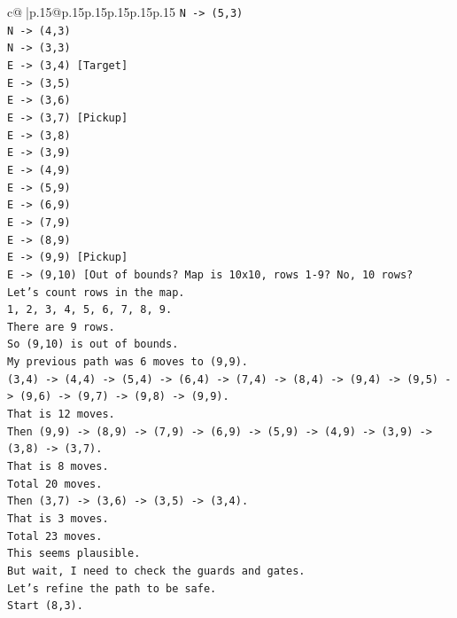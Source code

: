 \documentclass{article}
\begin{document}
{\begin{supertabular}{c@{$\;$}|p{.15\linewidth}@{}p{.15\linewidth}p{.15\linewidth}p{.15\linewidth}p{.15\linewidth}p{.15\linewidth}}
{{{\texttt{N {-}> (5,3)} \\
\texttt{N {-}> (4,3)} \\
\texttt{N {-}> (3,3)} \\
\texttt{E {-}> (3,4) {[}Target{]}} \\
\texttt{E {-}> (3,5)} \\
\texttt{E {-}> (3,6)} \\
\texttt{E {-}> (3,7) {[}Pickup{]}} \\
\texttt{E {-}> (3,8)} \\
\texttt{E {-}> (3,9)} \\
\texttt{E {-}> (4,9)} \\
\texttt{E {-}> (5,9)} \\
\texttt{E {-}> (6,9)} \\
\texttt{E {-}> (7,9)} \\
\texttt{E {-}> (8,9)} \\
\texttt{E {-}> (9,9) {[}Pickup{]}} \\
\texttt{E {-}> (9,10) {[}Out of bounds? Map is 10x10, rows 1{-}9? No, 10 rows?} \\
\texttt{Let's count rows in the map.} \\
\texttt{1, 2, 3, 4, 5, 6, 7, 8, 9.} \\
\texttt{There are 9 rows.} \\
\texttt{So (9,10) is out of bounds.} \\
\texttt{My previous path was 6 moves to (9,9).} \\
\texttt{(3,4) {-}> (4,4) {-}> (5,4) {-}> (6,4) {-}> (7,4) {-}> (8,4) {-}> (9,4) {-}> (9,5) {-}> (9,6) {-}> (9,7) {-}> (9,8) {-}> (9,9).} \\
\texttt{That is 12 moves.} \\
\texttt{Then (9,9) {-}> (8,9) {-}> (7,9) {-}> (6,9) {-}> (5,9) {-}> (4,9) {-}> (3,9) {-}> (3,8) {-}> (3,7).} \\
\texttt{That is 8 moves.} \\
\texttt{Total 20 moves.} \\
\texttt{Then (3,7) {-}> (3,6) {-}> (3,5) {-}> (3,4).} \\
\texttt{That is 3 moves.} \\
\texttt{Total 23 moves.} \\
\texttt{This seems plausible.} \\
\texttt{But wait, I need to check the guards and gates.} \\
\texttt{Let's refine the path to be safe.} \\
\texttt{Start (8,3).} \\
}}}
\end{supertabular}}
\end{document}
